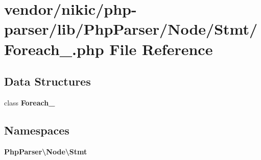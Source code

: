 \section{vendor/nikic/php-\/parser/lib/\+Php\+Parser/\+Node/\+Stmt/\+Foreach\+\_\+.php File Reference}
\label{_foreach___8php}
\subsection*{Data Structures}
\begin{DoxyCompactItemize}
\item 
class {\bf Foreach\+\_\+}
\end{DoxyCompactItemize}
\subsection*{Namespaces}
\begin{DoxyCompactItemize}
\item 
 {\bf Php\+Parser\textbackslash{}\+Node\textbackslash{}\+Stmt}
\end{DoxyCompactItemize}
